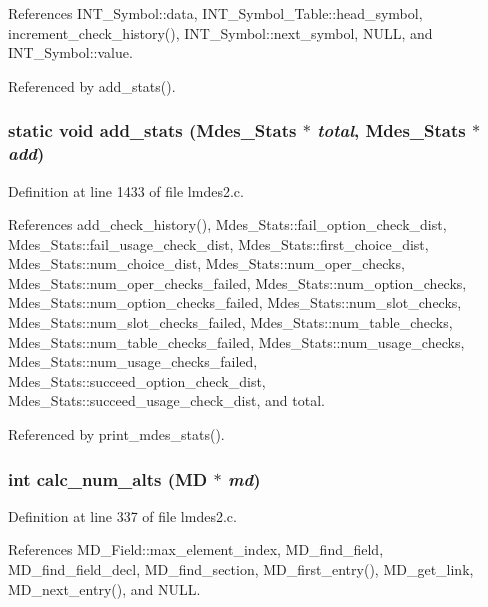 References INT\_\-Symbol::data, INT\_\-Symbol\_\-Table::head\_\-symbol, increment\_\-check\_\-history(), INT\_\-Symbol::next\_\-symbol, NULL, and INT\_\-Symbol::value.

Referenced by add\_\-stats().
\subsubsection{\setlength{\rightskip}{0pt plus 5cm}static void add\_\-stats (\bf{Mdes\_\-Stats} $\ast$ {\em total}, \bf{Mdes\_\-Stats} $\ast$ {\em add})\hspace{0.3cm}{\tt  [static]}}\label{lmdes2_8c_4df107e0ccc474fa9c0486d3a0c6a35e}




Definition at line 1433 of file lmdes2.c.

References add\_\-check\_\-history(), Mdes\_\-Stats::fail\_\-option\_\-check\_\-dist, Mdes\_\-Stats::fail\_\-usage\_\-check\_\-dist, Mdes\_\-Stats::first\_\-choice\_\-dist, Mdes\_\-Stats::num\_\-choice\_\-dist, Mdes\_\-Stats::num\_\-oper\_\-checks, Mdes\_\-Stats::num\_\-oper\_\-checks\_\-failed, Mdes\_\-Stats::num\_\-option\_\-checks, Mdes\_\-Stats::num\_\-option\_\-checks\_\-failed, Mdes\_\-Stats::num\_\-slot\_\-checks, Mdes\_\-Stats::num\_\-slot\_\-checks\_\-failed, Mdes\_\-Stats::num\_\-table\_\-checks, Mdes\_\-Stats::num\_\-table\_\-checks\_\-failed, Mdes\_\-Stats::num\_\-usage\_\-checks, Mdes\_\-Stats::num\_\-usage\_\-checks\_\-failed, Mdes\_\-Stats::succeed\_\-option\_\-check\_\-dist, Mdes\_\-Stats::succeed\_\-usage\_\-check\_\-dist, and total.

Referenced by print\_\-mdes\_\-stats().
\subsubsection{\setlength{\rightskip}{0pt plus 5cm}int calc\_\-num\_\-alts (\bf{MD} $\ast$ {\em md})}\label{lmdes2_8c_faa1394d0cf90c7e14bf82c367326c07}




Definition at line 337 of file lmdes2.c.

References MD\_\-Field::max\_\-element\_\-index, MD\_\-find\_\-field, MD\_\-find\_\-field\_\-decl, MD\_\-find\_\-section, MD\_\-first\_\-entry(), MD\_\-get\_\-link, MD\_\-next\_\-entry(), and NULL.

